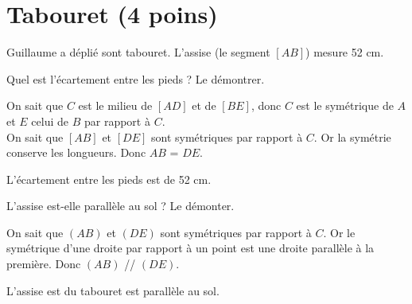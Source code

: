 \section{Tabouret (4 poins)}

\begin{multicols}{2}
	Guillaume a déplié sont tabouret. L'assise (le segment $[AB]$) mesure 52 cm.

\begin{questions}
	\question[2] Quel est l'écartement entre les pieds ? Le démontrer.
	\begin{solution}
		On sait que $C$ est le milieu de $[AD]$ et de $[BE]$, donc $C$ est le symétrique de $A$ et $E$ celui de $B$ par rapport à $C$.\\
		
		On sait que $[AB]$ et $[DE]$ sont symétriques par rapport à $C$.
		Or la symétrie conserve les longueurs.
		Donc $AB$ = $DE$.
		
		L'écartement entre les pieds est de 52 cm.
		
	\end{solution}
	
	\question[2] L'assise est-elle parallèle au sol ? Le démonter.
	
	\begin{solution}
		On sait que $(AB)$ et $(DE)$ sont symétriques par rapport à $C$.
		Or le symétrique d'une droite par rapport à un point est une droite parallèle à la première.
		Donc $(AB)$ // $(DE)$.
		
		L'assise est du tabouret est parallèle au sol.
	\end{solution}
\end{questions}


\end{multicols}
